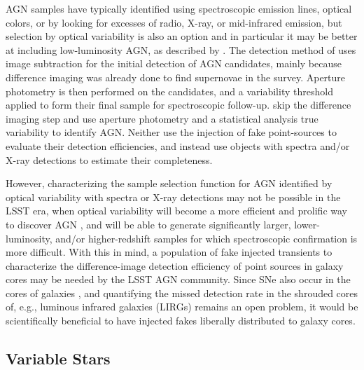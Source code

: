 \documentclass[DM,lsstdraft,toc]{lsstdoc}
\begin{document}
AGN samples have typically identified using spectroscopic emission lines, optical colors, or by looking for excesses of radio, X-ray, or mid-infrared emission, but selection by optical variability is also an option and in particular it may be better at including low-luminosity AGN, as described by \cite[e.g.,][]{2008A&A...488...73T,2010ApJ...723..737V}. The detection method of \cite{2008A&A...488...73T} uses image subtraction for the initial detection of AGN candidates, mainly because difference imaging was already done to find supernovae in the survey. Aperture photometry is then performed on the candidates, and a variability threshold applied to form their final sample for spectroscopic follow-up. \cite{2010ApJ...723..737V} skip the difference imaging step and use aperture photometry and a statistical analysis true variability to identify AGN. Neither use the injection of fake point-sources to evaluate their detection efficiencies, and instead use objects with spectra and/or X-ray detections to estimate their completeness. %

However, characterizing the sample selection function for AGN identified by optical variability with spectra or X-ray detections may not be possible in the LSST era, when optical variability will become a more efficient and prolific way to discover AGN \cite[e.g.,][]{2014ApJ...782...37C}, and will be able to generate significantly larger, lower-luminosity, and/or higher-redshift samples for which spectroscopic confirmation is more difficult. With this in mind, a population of fake injected transients to characterize the difference-image detection efficiency of point sources in galaxy cores may be needed by the LSST AGN community. Since SNe also occur in the cores of galaxies \citep[e.g.,][]{2009A&A...507L..17P,2012ApJ...744L..19K}, and quantifying the missed detection rate in the shrouded cores of, e.g., luminous infrared galaxies (LIRGs) remains an open problem, it would be scientifically beneficial to have injected fakes liberally distributed to galaxy cores.

\subsection{Variable Stars}\label{ssec:sci_varstar}
\end{document}
